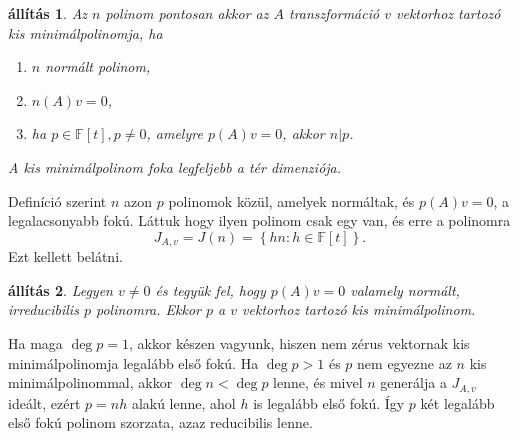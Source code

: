 \documentclass[9pt, a4paper, showtrims]{memoir}
\makeatletter
\renewenvironment{proof}[1][\proofname]
    {\par\pushQED{\qed}%
    \normalfont \topsep6\p@\@plus6\p@\relax
    \trivlist
    \item[\hskip\labelsep
        \itshape
    #1\@addpunct{:}]\ignorespaces}
    {\popQED\endtrivlist\@endpefalse}
\theoremstyle{plain}
\newtheorem{proposition}{állítás}[chapter]
\theoremstyle{remark}
\theoremstyle{definition}
\makeatother
\begin{document}
\begin{proposition}
	Az  $n$  polinom pontosan akkor az $A$ transzformáció $v$ vektorhoz tartozó kis minimálpolinomja, ha
	\begin{enumerate}
		\item $n$ normált polinom,
		\item $n\left( A \right)v=0$,
		\item ha $p\in\mathbb{F}\left[ t \right], p\neq 0$, amelyre
		      $p\left( A \right)v=0$, akkor $n|p$.
	\end{enumerate}
	A kis minimálpolinom foka legfeljebb a tér dimenziója.
\end{proposition}
\begin{proof}
	Definíció szerint $n$ azon $p$ polinomok közül,
	amelyek normáltak, és $p\left( A \right)v=0$, a legalacsonyabb fokú.
	Láttuk hogy ilyen polinom csak egy van, és erre a polinomra
	\[
		J_{A,v}=J\left( n \right)=\left\{ hn:h\in\mathbb{F}\left[ t \right] \right\}.
	\]
	Ezt kellett belátni.
\end{proof}
\begin{proposition}
	Legyen $v\neq 0$ és tegyük fel, hogy $p\left( A \right)v=0$ valamely normált,
	irreducibilis $p$ polinomra.
	Ekkor $p$ a $v$ vektorhoz tartozó kis minimálpolinom.
\end{proposition}
\begin{proof}
	Ha maga $\deg p=1$, akkor készen vagyunk, hiszen nem zérus vektornak kis minimálpolinomja legalább első fokú.
	Ha $\deg p>1$ és $p$ nem egyezne az $n$ kis minimálpolinommal,
	akkor $\deg n<\deg p$ lenne, és mivel $n$ generálja a $J_{A,v}$ ideált,
	ezért $p=nh$ alakú lenne, ahol $h$ is legalább első fokú.
	Így $p$ két legalább első fokú polinom szorzata, azaz reducibilis lenne.
\end{proof}
\end{document}

